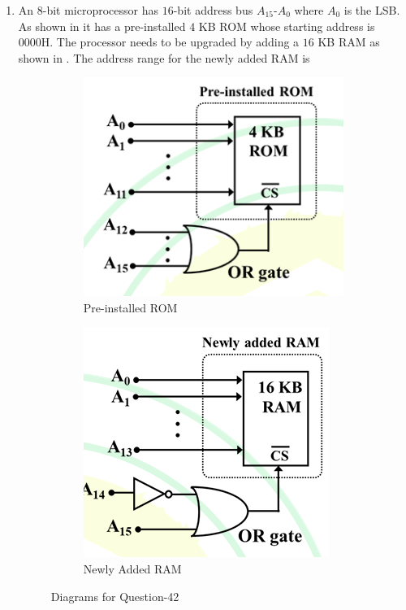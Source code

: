 \documentclass[journal,12pt,onecolumn]{IEEEtran}
\theoremstyle{remark}
\begin{document}
\begin{enumerate}
\item An $8$-bit microprocessor has $16$-bit address bus $A_{15}$-$A_0$ where $A_0$ is the LSB. As shown in  it has a pre-installed $4$ KB ROM whose starting address is 0000H. The processor needs to be upgraded by adding a $16$ KB RAM as shown in . The address range for the newly added RAM is \par\hfill{}
\begin{figure}[H]
\centering
\begin{subfigure}{.5\columnwidth}
  \centering
  \includegraphics[width=.6\columnwidth]{Figs/Q-42(a).png}
  \caption{Pre-installed ROM}
  \label{42(a)}
\end{subfigure}%
\begin{subfigure}{.5\textwidth}
  \centering
  \includegraphics[width=.6\columnwidth]{Figs/Q-42(b).png}
  \caption{Newly Added RAM}
  \label{42(b)}
\end{subfigure}
\caption{Diagrams for Question-42}
\label{42}
\end{figure}
\begin{enumerate}
\end{enumerate}



\end{enumerate}
\end{document}
